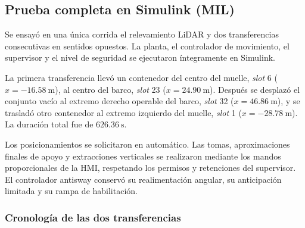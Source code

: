 \documentclass[a4paper,10pt,onecolumn,journal]{ieeeconf}
\numberwithin{equation}{section}
\begin{document}



\subsection{Prueba completa en Simulink (MIL)}
\label{subsec:prueba_completa_MIL}

Se ensayó en una única corrida el relevamiento LiDAR y dos transferencias consecutivas en sentidos opuestos. La planta, el controlador de movimiento, el supervisor y el nivel de seguridad se ejecutaron íntegramente en Simulink.

La primera transferencia llevó un contenedor del centro del muelle, \textit{slot} 6 ($x=-16.58~\mathrm{m}$), al centro del barco, \textit{slot} 23 ($x=24.90~\mathrm{m}$). Después se desplazó el conjunto vacío al extremo derecho operable del barco, \textit{slot} 32 ($x=46.86~\mathrm{m}$), y se trasladó otro contenedor al extremo izquierdo del muelle, \textit{slot} 1 ($x=-28.78~\mathrm{m}$). La duración total fue de $626.36~\mathrm{s}$.

Los posicionamientos se solicitaron en automático. Las tomas, aproximaciones finales de apoyo y extracciones verticales se realizaron mediante los mandos proporcionales de la HMI, respetando los permisos y retenciones del supervisor. El controlador antisway conservó su realimentación angular, su anticipación limitada y su rampa de habilitación.


\FloatBarrier
{}
\subsubsection{Cronología de las dos transferencias}
\end{document}
